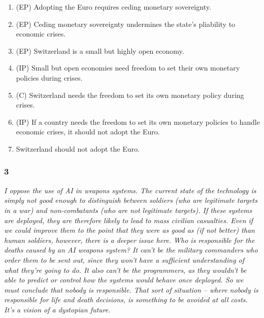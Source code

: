 \begin{enumerate}
    \item (EP) Adopting the Euro requires ceding monetary sovereignty.
    \item (EP) Ceding monetary sovereignty undermines the state's pliability
        to economic crises.
    \item (EP) Switzerland is a small but highly open economy.
    \item (IP) Small but open economies need freedom to set their own
        monetary policies during crises.
    \item (C) Switzerland needs the freedom to set its own monetary policy
        during crises.
    \item (IP) If a country needs the freedom to set its own monetary policies
        to handle economic crises, it should not adopt the Euro.
    \item Switzerland should not adopt the Euro.
\end{enumerate}

\subsubsection{3}
\textit{I oppose the use of AI in weapons systems. The current state of
the technology is simply not good enough to distinguish between soldiers
(who are legitimate targets in a war) and non-combatants (who are not
legitimate targets). If these systems are deployed, they are therefore
likely to lead to mass civilian casualties. Even if we could improve
them to the point that they were as good as (if not better) than human
soldiers, however, there is a deeper issue here. Who is responsible for
the deaths caused by an AI weapons system? It can’t be the military
commanders who order them to be sent out, since they won’t have a
sufficient understanding of what they’re going to do. It also can’t be
the programmers, as they wouldn’t be able to predict or control how the
systems would behave once deployed. So we must conclude that nobody is
responsible. That sort of situation – where nobody is responsible for
life and death decisions, is something to be avoided at all costs.
It’s a vision of a dystopian future.}

